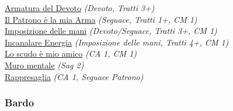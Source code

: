 \begin{multicols}{3}
{\begin{flushleft}
\hyperlink{Armatura del Devoto}{Armatura del Devoto} \textit{(Devoto, Tratti 3+)}\\
\hyperlink{Il Patrono è la mia Arma}{Il Patrono è la mia Arma} \textit{(Seguace, Tratti 1+, CM 1)}\\
\hyperlink{Imposizione delle mani}{Imposizione delle mani} \textit{(Devoto/Seguace, Tratti 3+, CM 1)}\\
\hyperlink{Incanalare Energia}{Incanalare Energia} \textit{(Imposizione delle mani, Tratti 4+, CM 1)}\\
\hyperlink{Lo scudo è mio amico}{Lo scudo è mio amico} \textit{(CA 1, CM 1)}\\
\hyperlink{Muro mentale}{Muro mentale} \textit{(Sag 2)}\\
\hyperlink{Rappresaglia}{Rappresaglia} \textit{(CA 1, Seguace Patrono)}\\

\titlespacing*{\subsubsection}{0pt}{0.5em}{0.5em}\subsubsection*{Bardo}


\end{flushleft}}
\end{multicols}
